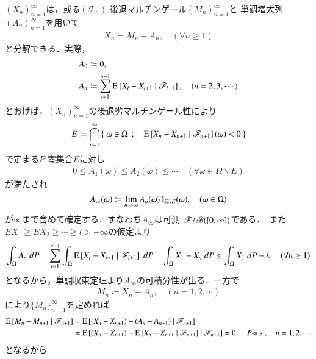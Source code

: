 	\begin{prf}
		$(X_n)_{n=1}^\infty$は，或る$(\mathscr{F}_n)$-後退マルチンゲール$(M_n)_{n=1}^\infty$と
		単調増大列$(A_n)_{n=1}^\infty$を用いて
		\begin{align}
			X_n = M_n - A_n,
			\quad (\forall n \geq 1)
		\end{align}
		と分解できる．実際，
		\begin{align}
			A_0 &\coloneqq 0, \\
			A_n &\coloneqq \sum_{i=1}^{n-1} \operatorname{E} \left[ X_i - X_{i+1} \ \middle|\ \mathscr{F}_{i+1} \right],
			\quad (n=2,3,\cdots)
		\end{align}
		とおけば，$(X_n)_{n=1}^\infty$の後退劣マルチンゲール性により
		\begin{align}
			E \coloneqq \bigcap_{n=1}^\infty \left\{\ \omega \ni \Omega\ \, ; \quad \operatorname{E} \left[ X_n - X_{n+1} \ \middle|\ \mathscr{F}_{n+1} \right](\omega) < 0\ \right\}
		\end{align}
		で定まる$P$-零集合$E$に対し
		\begin{align}
			0 \leq A_1(\omega) \leq A_2(\omega) \leq \cdots \quad (\forall \omega \in \Omega \backslash E)
		\end{align}
		が満たされ
		\begin{align}
			A_\infty(\omega) \coloneqq \lim_{n \to \infty} A_n(\omega) \mbox{1}\hspace{-0.25em}\mbox{l}_{\Omega \backslash E}(\omega),
			\quad (\omega \in \Omega)
		\end{align}
		が$\infty$まで含めて確定する．すなわち$A_\infty$は可測
		$\mathscr{F}/\mathscr{B}([0,\infty])$である．\
		また$EX_1 \geq EX_2 \geq \cdots \geq l > -\infty$の仮定より
		\begin{align}
			\int_\Omega A_n\ dP
			= \sum_{i=1}^{n-1} \int_{\Omega} \operatorname{E} \left[ X_i - X_{i+1} \ \middle|\ \mathscr{F}_{i+1} \right]\ dP
			= \int_\Omega X_1 - X_n\ dP
			\leq \int_\Omega X_1\ dP - l,
			\quad (\forall n \geq 1)
		\end{align}
		となるから，単調収束定理より$A_\infty$の可積分性が出る．一方で
		\begin{align}
			M_n \coloneqq X_n + A_n,
			\quad (n = 1,2,\cdots)
		\end{align}
		により$\{M_n\}_{n=1}^\infty$を定めれば
		\begin{align}
			\operatorname{E} \left[ M_n - M_{n+1} \ \middle|\ \mathscr{F}_{n+1} \right]
			&= \operatorname{E} \left[ (X_n - X_{n+1}) + (A_n - A_{n+1}) \ \middle|\ \mathscr{F}_{n+1} \right] \\
			&= \operatorname{E} \left[ (X_n - X_{n+1}) - \operatorname{E} \left[ X_n - X_{n+1} \ \middle|\ \mathscr{F}_{n+1} \right] \ \middle|\ \mathscr{F}_{n+1} \right]
			= 0,
			\quad \mbox{$P$-a.s.},
			\quad n=1,2,\cdots
		\end{align}
		となるから
		\begin{align}

\end{align}
\end{prf}
